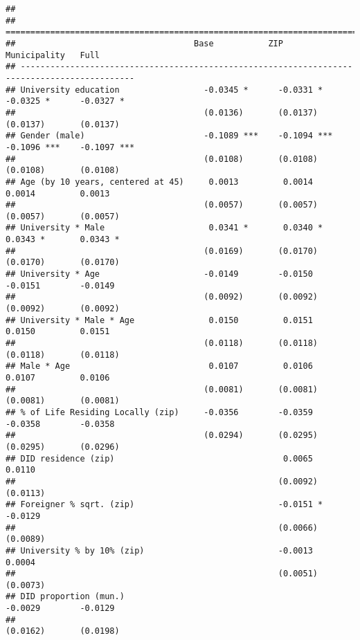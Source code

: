 \documentclass[
]{article}
\begin{document}
\begin{verbatim}
## 
## =============================================================================================
##                                    Base           ZIP            Municipality   Full         
## ---------------------------------------------------------------------------------------------
## University education                 -0.0345 *      -0.0331 *      -0.0325 *      -0.0327 *  
##                                      (0.0136)       (0.0137)       (0.0137)       (0.0137)   
## Gender (male)                        -0.1089 ***    -0.1094 ***    -0.1096 ***    -0.1097 ***
##                                      (0.0108)       (0.0108)       (0.0108)       (0.0108)   
## Age (by 10 years, centered at 45)     0.0013         0.0014         0.0014         0.0013    
##                                      (0.0057)       (0.0057)       (0.0057)       (0.0057)   
## University * Male                     0.0341 *       0.0340 *       0.0343 *       0.0343 *  
##                                      (0.0169)       (0.0170)       (0.0170)       (0.0170)   
## University * Age                     -0.0149        -0.0150        -0.0151        -0.0149    
##                                      (0.0092)       (0.0092)       (0.0092)       (0.0092)   
## University * Male * Age               0.0150         0.0151         0.0150         0.0151    
##                                      (0.0118)       (0.0118)       (0.0118)       (0.0118)   
## Male * Age                            0.0107         0.0106         0.0107         0.0106    
##                                      (0.0081)       (0.0081)       (0.0081)       (0.0081)   
## % of Life Residing Locally (zip)     -0.0356        -0.0359        -0.0358        -0.0358    
##                                      (0.0294)       (0.0295)       (0.0295)       (0.0296)   
## DID residence (zip)                                  0.0065                        0.0110    
##                                                     (0.0092)                      (0.0113)   
## Foreigner % sqrt. (zip)                             -0.0151 *                     -0.0129    
##                                                     (0.0066)                      (0.0089)   
## University % by 10% (zip)                           -0.0013                        0.0004    
##                                                     (0.0051)                      (0.0073)   
## DID proportion (mun.)                                              -0.0029        -0.0129    
##                                                                    (0.0162)       (0.0198)   

\end{verbatim}
\end{document}

